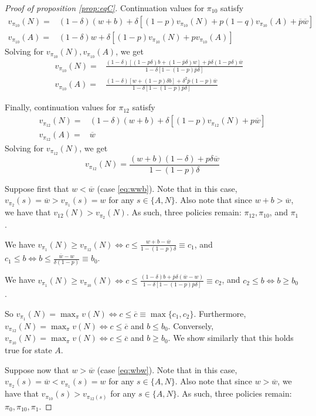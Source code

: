 \documentclass[12pt,a4paper]{article}
\theoremstyle{definition}
\newcommand{\wb}{\overline{w}}
\newcommand{\pb}{\overline{p}}
\newcommand{\de}{\delta}
\begin{document}
{\begin{proof}[Proof of proposition \ref{prop:eqC}]
    Continuation values for $\pi_{10}$ satisfy
    \begin{align*}
        v_{\pi_{10}}(N) =& (1-\de) (w+b) + \de [(1-p) v_{\pi_{10}}(N) + p (1-q) v_{\pi_{10}}(A) + \pb \wb] \\ 
        v_{\pi_{10}}(A) =& (1-\de) w + \de [(1-p) v_{\pi_{10}}(N) + p v_{\pi_{10}}(A)]
    \end{align*}
    Solving for $v_{\pi_{10}}(N), v_{\pi_{10}}(A)$, we get
    \begin{align*}
        v_{\pi_{10}}(N) =& \frac{(1-\de)[(1-p\de)b+(1-\pb\de)w]+\pb\de(1-p\de)\wb}{1-\de[1-(1-p)\pb\de]}\\
        v_{\pi_{10}}(A) =& \frac{(1-\de)[w+(1-p)\de b]+\de^2\pb(1-p)\wb}{1-\de[1-(1-p)\pb\de]}&
    \end{align*}

    Finally, continuation values for $\pi_{12}$ satisfy
    \begin{align*}
        v_{\pi_{12}}(N) =& (1-\de) (w+b) + \de [(1-p) v_{\pi_{12}}(N) + p\wb] \\ 
        v_{\pi_{12}}(A) =& \wb
    \end{align*}
    Solving for $v_{\pi_{12}}(N)$, we get
    $$
    v_{\pi_{12}}(N) = \frac{(w+b)(1-\de)+p\de\wb}{1-(1-p)\de}
    $$

    Suppose first that $w < \wb$ (case \ref{eq:wwb}). Note that in this case, $v_{\pi_2}(s) = \wb > v_{\pi_1}(s) = w$ for any $s \in \{A,N\}$. Also note that since $w+b > \wb$, we have that $v_{12}(N) > v_{\pi_2}(N)$. As such, three policies remain: $\pi_{12}, \pi_{10}$, and $\pi_1$. 

    We have $v_{\pi_1}(N) \geq v_{\pi_{12}}(N) \iff c \leq \frac{w+b-\wb}{1-(1-p)\de} \equiv c_1$, and $c_1 \leq b \iff b \leq \frac{\wb-w}{\de(1-p)} \equiv b_0$. 

    We have $v_{\pi_1}(N) \geq v_{\pi_{10}}(N) \iff c \leq \frac{(1-\de)b+\pb\de(\wb-w)}{1-\de[1-(1-p)\pb\de]} \equiv c_2$, and $c_2 \leq b \iff b \geq b_0$. 

    So $v_{\pi_1}(N) = \max_{\pi} v(N) \iff c \leq \overline{c} \equiv \max\{c_1, c_2\}$. Furthermore, $v_{\pi_{12}}(N) = \max_{\pi} v(N) \iff c \leq \overline{c}$ and $b \leq b_0$. Conversely, $v_{\pi_{10}}(N) = \max_{\pi} v(N) \iff c \leq \overline{c}$ and $b \geq b_0$. We show similarly that this holds true for state $A$. 

    Suppose now that $w > \wb$ (case \ref{eq:wbw}). Note that in this case, $v_{\pi_2}(s) = \wb < v_{\pi_1}(s) = w$ for any $s \in \{A,N\}$. Also note that since $w > \wb$, we have that $v_{\pi_{10}}(s) > v_{\pi_{12}(s)}$ for any $s \in \{A,N\}$. As such, three policies remain: $\pi_0, \pi_{10}, \pi_1$. 


\end{proof}}
\end{document}
